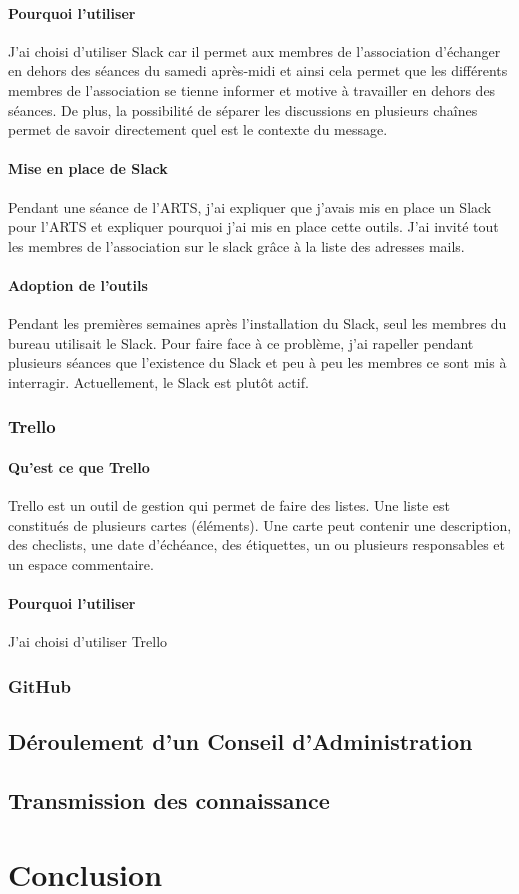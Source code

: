 \documentclass[12pt,a4paper]{report}
\begin{document}
      \subsubsection{Pourquoi l'utiliser}
        J'ai choisi d'utiliser Slack car il permet aux membres de l'association d'échanger en dehors des séances du samedi après-midi et ainsi cela permet que les différents membres de l'association se tienne informer et motive à travailler en dehors des séances. De plus, la possibilité de séparer les discussions en plusieurs chaînes permet de savoir directement quel est le contexte du message.

      \subsubsection{Mise en place de Slack}
        Pendant une séance de l'ARTS, j'ai expliquer que j'avais mis en place un Slack pour l'ARTS et expliquer pourquoi j'ai mis en place cette outils.
        J'ai invité tout les membres de l'association sur le slack grâce à la liste des adresses mails.

      \subsubsection{Adoption de l'outils}
        Pendant les premières semaines après l'installation du Slack, seul les membres du bureau utilisait le Slack. Pour faire face à ce problème, j'ai rapeller pendant plusieurs séances que l'existence du Slack et peu à peu les membres ce sont mis à interragir.
        Actuellement, le Slack est plut\^ot actif.

    \subsection{Trello}
      \subsubsection{Qu'est ce que Trello}
        Trello est un outil de gestion qui permet de faire des listes. Une liste est constitués de plusieurs cartes (éléments). Une carte peut contenir une description, des checlists, une date d'échéance, des étiquettes, un ou plusieurs responsables et un espace commentaire.

      \subsubsection{Pourquoi l'utiliser}
        J'ai choisi d'utiliser Trello

    \subsection{GitHub}

  \section{Déroulement d'un Conseil d'Administration}

  \section{Transmission des connaissance}

\chapter*{Conclusion}
\end{document}
